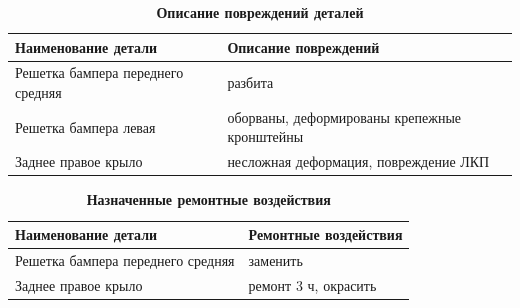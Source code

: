 {\small \begin{table}[]
\begin{longtable}{@{}ll@{}}
	\caption[]{\footnotesize {\textbf{Описание повреждений деталей}}} \label{tab:4}\\ 
		\toprule
	\textbf{	Наименование детали       }               &\textbf{ Описание повреждений}                         \\ \midrule
		Решетка бампера переднего средняя        & разбита                                      \\
		Решетка бампера левая                    & оборваны, деформированы крепежные кронштейны \\
		Заднее правое крыло                      & несложная деформация, повреждение ЛКП        \\ \bottomrule
	\end{longtable}
\end{table}}
%
%
%
%
{\small \begin{table}
	\begin{longtable}{@{}ll@{}}
	\caption[]{\footnotesize {\textbf{Назначенные ремонтные воздействия}}} \label{tab:2}\\ 
	\toprule
\textbf{Наименование детали}                      & \textbf{Ремонтные воздействия}\\ \midrule
Решетка бампера переднего средняя        & заменить             \\
Заднее правое крыло                      & ремонт 3 ч, окрасить \\ \bottomrule
\end{longtable}

\end{table}}

